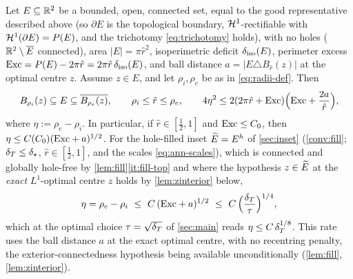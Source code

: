 \begin{theorem}\label{thm:annulus}
Let $E\subseteq\mathbb{R}^2$ be a bounded, open, connected set, equal to the good
representative described above \textup{(}so $\partial E$ is the topological
boundary, $\mathcal{H}^1$-rectifiable with $\mathcal{H}^1(\partial E)=P(E)$, and the
trichotomy \eqref{eq:trichotomy} holds\textup{)}, with no holes
\textup{(}$\mathbb{R}^2\setminus\overline E$ connected\textup{)}, area
$|E|=\pi\hat r^2$, isoperimetric deficit $\delta_{\mathrm{iso}}(E)$, perimeter excess
$\mathrm{Exc}=P(E)-2\pi\hat r=2\pi\hat r\,\delta_{\mathrm{iso}}(E)$, and ball distance
$a=|E\triangle B_{\hat r}(z)|$ at the optimal centre $z$. Assume $z\in E$,
and let $\rho_i,\rho_e$ be as in \eqref{eq:radii-def}. Then
\begin{equation}\label{eq:annulus}
   B_{\rho_i}(z)\subseteq E\subseteq \overline{B_{\rho_e}(z)},
   \qquad
   \rho_i\le\hat r\le\rho_e,
   \qquad
   4\eta^2\le 2(2\pi\hat r+\mathrm{Exc})\Bigl(\mathrm{Exc}+\frac{2a}{\hat r}\Bigr),
\end{equation}
where $\eta:=\rho_e-\rho_i$.  In particular, if
$\hat r\in[\tfrac12,1]$ and $\mathrm{Exc}\le C_0$, then
$\eta\le C(C_0)(\mathrm{Exc}+a)^{1/2}$.  For the hole-filled inset $\widetilde{E}=E^h$ of
\cref{sec:inset} \textup{(}\cref{conv:fill}; $\delta_T\le\delta_\star$,
$\hat r\in[\tfrac12,1]$, and the scales \eqref{eq:ann-scales}\textup{)}, which
is connected and globally hole-free by \cref{lem:fill}\ref{it:fill-top} and
where the hypothesis $z\in\widetilde{E}$ at the \emph{exact} $L^1$-optimal centre $z$
holds by \cref{lem:zinterior} below,
\begin{equation}\label{eq:annulus-rate}
   \eta=\rho_e-\rho_i\ \le\ C\,(\Exc+a)^{1/2}\ \le\ C\,\Bigl(\frac{\dT}{\tau}
   \Bigr)^{1/4},
\end{equation}
which at the optimal choice $\tau=\sqrt{\delta_T}$ of \cref{sec:main} reads
$\eta\le C\,\delta_T^{1/8}$. This rate uses the ball distance $a$ at the exact
optimal centre, with no recentring penalty, the exterior-connectedness
hypothesis being available unconditionally
\textup{(}\cref{lem:fill}, \cref{lem:zinterior}\textup{)}.
\end{theorem}

